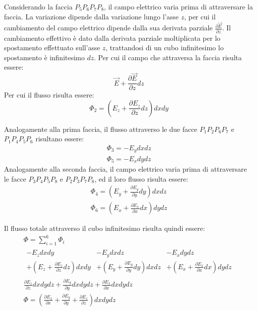 \documentclass{article}
\numberwithin{equation}{subsection}
\begin{document}
Considerando la faccia $P_5P_6P_7P_8$, il campo elettrico varia prima di attraversare la faccia. La variazione dipende dalla variazione lungo l'asse $z$, per cui il cambiamento 
del campo elettrico dipende dalla sua derivata parziale $\displaystyle\frac{\partial\vec{E}}{\partial z}$. Il cambiamento effettivo è dato dalla derivata parziale 
moltiplicata per lo spostamento effettuato sull'asse $z$, trattandosi di un cubo infinitesimo lo spostamento è infinitesimo $dz$. Per cui il campo che attraversa la faccia 
risulta essere:
\begin{equation*}
    \vec{E}+\displaystyle\frac{\partial \vec{E}}{\partial z}dz
\end{equation*} 
Per cui il flusso risulta essere:
\begin{equation*}
    \Phi_2=\left(E_z+\displaystyle\frac{\partial E_z}{\partial z}dz\right)dxdy
\end{equation*}

Analogamente alla prima faccia, il flusso attraverso le due facce $P_1P_2P_6P_7$ e $P_1P_4P_5P_6$ risultano essere:
\begin{gather*}
    \Phi_3=-E_ydxdz\\
    \Phi_5=-E_xdydz
\end{gather*}
Analogamente alla seconda faccia, il campo elettrico varia prima di attraversare le facce $P_3P_4P_5P_8$ e $P_2P_3P_7P_8$, ed il loro flusso risulta essere:
\begin{gather*}
    \Phi_4=\left(E_y+\displaystyle\frac{\partial E_y}{\partial y}dy\right)dxdz\\
    \Phi_6=\left(E_x+\displaystyle\frac{\partial E_x}{\partial x}dx\right)dydz
\end{gather*}

Il flusso totale attraverso il cubo infinitesimo risulta quindi essere:
\begin{gather*}
    \Phi=\displaystyle\sum_{i=1}^6\Phi_i\\
    \begin{matrix}
        -E_zdxdy & -E_ydxdz & -E_xdydz\\
        +\left(E_z+\displaystyle\frac{\partial E_z}{\partial z}dz\right)dxdy & +\left(E_y+\displaystyle\frac{\partial E_y}{\partial y}dy\right)dxdz & +\left(E_x+\displaystyle\frac{\partial E_x}{\partial x}dx\right)dydz
    \end{matrix}\\
    \displaystyle\frac{\partial E_z}{\partial z}dxdydz+\frac{\partial E_y}{\partial y}dxdydz+\frac{\partial E_x}{\partial x}dxdydz\\
    \Phi=\left(\displaystyle\frac{\partial E_x}{\partial x}+\frac{\partial E_y}{\partial y}+\frac{\partial E_z}{\partial z}\right)dxdydz
\end{gather*}
\end{document}
